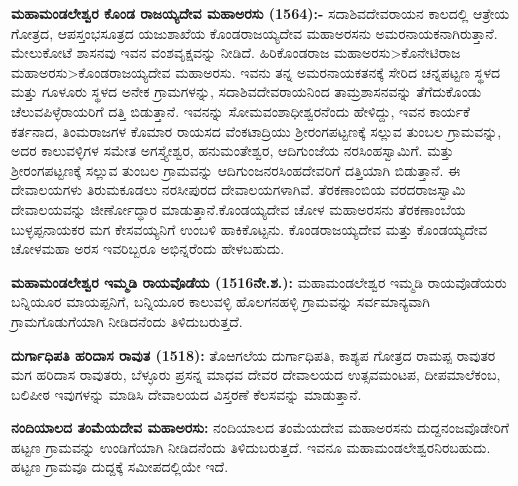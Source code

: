 \textbf{ಮಹಾಮಂಡಲೇಶ್ವರ ಕೊಂಡ ರಾಜಯ್ಯದೇವ ಮಹಾಅರಸು (1564):-} ಸದಾಶಿವದೇವರಾಯನ ಕಾಲದಲ್ಲಿ ಆತ್ರೇಯ ಗೋತ್ರದ, ಆಪಸ್ತಂಭಸೂತ್ರದ ಯಜುಶಾಖೆಯ ಕೊಂಡರಾಜಯ್ಯದೇವ ಮಹಾಅರಸನು ಅಮರನಾಯಕನಾಗಿರುತ್ತಾನೆ. ಮೇಲುಕೋಟೆ ಶಾಸನವು ಇವನ ವಂಶವೃಕ್ಷವನ್ನು ನೀಡಿದೆ. ಹಿರಿಕೊಂಡರಾಜ ಮಹಾಅರಸು\textgreater ಕೊನೇಟಿರಾಜ ಮಹಾಅರಸು\textgreater \break ಕೊಂಡರಾಜಯ್ಯದೇವ ಮಹಾಅರಸು. ಇವನು ತನ್ನ ಅಮರನಾಯಕತನಕ್ಕೆ ಸೇರಿದ ಚನ್ನಪಟ್ಟಣ ಸ್ಥಳದ ಮತ್ತು ಗೂಳೂರು ಸ್ಥಳದ ಅನೇಕ ಗ್ರಾಮಗಳನ್ನು, ಸದಾಶಿವದೇವರಾಯನಿಂದ ತಾಮ್ರಶಾಸನವನ್ನು ತೆಗೆದುಕೊಂಡು ಚೆಲುವಪಿಳ್ಳೆರಾಯರಿಗೆ ದತ್ತಿ ಬಿಡುತ್ತಾನೆ. ಇವನನ್ನು ಸೋಮವಂಶಾಧೀಶ್ವರನೆಂದು ಹೇಳಿದ್ದು, ಇವನ ಕಾರ್ಯಕೆ ಕರ್ತನಾದ, ತಿಂಮರಾಜಗಳ ಕೊಮಾರ ರಾಯಸದ ವೆಂಕಟಾದ್ರಿಯು ಶ‍್ರೀರಂಗಪಟ್ಟಣಕ್ಕೆ ಸಲ್ಲುವ ತುಂಬಲ ಗ್ರಾಮವನ್ನು, ಅದರ ಕಾಲುವಳ್ಳಿಗಳ ಸಮೇತ ಅಗಸ್ತ್ಯೇಶ್ವರ, ಹನುಮಂತೇಶ್ವರ, ಆದಿಗುಂಜೆಯ ನರಸಿಂಹಸ್ವಾಮಿಗೆ. ಮತ್ತು ಶ‍್ರೀರಂಗಪಟ್ಟಣಕ್ಕೆ ಸಲ್ಲುವ ತುಂಬಲ ಗ್ರಾಮವನ್ನು ಆದಿಗುಂಜನರಸಿಂಹದೇವರಿಗೆ ದತ್ತಿಯಾಗಿ ಬಿಡುತ್ತಾನೆ. ಈ ದೇವಾಲಯಗಳು ತಿರುಮಕೂಡಲು ನರಸೀಪುರದ ದೇವಾಲಯಗಳಾಗಿವೆ. ತೆರಕಣಾಂಬಿಯ ವರದರಾಜಸ್ವಾಮಿ ದೇವಾಲಯವನ್ನು ಜೀರ್ಣೋದ್ಧಾರ ಮಾಡುತ್ತಾನೆ.\break ಕೊಂಡಯ್ಯದೇವ ಚೋಳ ಮಹಾಅರಸನು ತೆರಕಣಾಂಬೆಯ ಬುಳ್ಳಪ್ಪನಾಯಕರ ಮಗ ಕೇಸವಯ್ಯನಿಗೆ ಉಂಬಳಿ ಹಾಕಿ\-ಕೊಟ್ಟನು. ಕೊಂಡರಾಜಯ್ಯದೇವ ಮತ್ತು ಕೊಂಡಯ್ಯದೇವ ಚೋಳಮಹಾ ಅರಸ ಇವರಿಬ್ಬರೂ ಅಭಿನ್ನರೆಂದು ಹೇಳಬಹುದು.

\textbf{ಮಹಾಮಂಡಲೇಶ್ವರ ಇಮ್ಮಡಿ ರಾಯವೊಡೆಯ (15\general{\enginline{-}}16ನೇ.ಶ.):} ಮಹಾಮಂಡಲೇಶ್ವರ ಇಮ್ಮಡಿ ರಾಯವೊಡೆಯರು ಬನ್ನಿಯೂರ ಮಾಯಪ್ಪನಿಗೆ, ಬನ್ನಿಯೂರ ಕಾಲುವಳ್ಳಿ ಹೊಲಗನಹಳ್ಳಿ ಗ್ರಾಮವನ್ನು ಸರ್ವಮಾನ್ಯವಾಗಿ ಗ್ರಾಮಗೊಡುಗೆಯಾಗಿ ನೀಡಿದನೆಂದು ತಿಳಿದುಬರುತ್ತದೆ.

\textbf{ದುರ್ಗಾಧಿಪತಿ ಹರಿದಾಸ ರಾವುತ (1518):} ತೊಱಗಲೆಯ ದುರ್ಗಾಧಿಪತಿ, ಕಾಶ್ಯಪ ಗೋತ್ರದ ರಾಮಪ್ಪ ರಾವುತರ ಮಗ ಹರಿದಾಸ ರಾವುತರು, ಬೆಳ್ಳೂರು ಪ್ರಸನ್ನ ಮಾಧವ ದೇವರ ದೇವಾಲಯದ ಉತ್ಸವಮಂಟಪ, ದೀಪಮಾಲೆಕಂಬ, ಬಲಿಪೀಠ ಇವುಗಳನ್ನು ಮಾಡಿಸಿ ದೇವಾಲಯದ ವಿಸ್ತರಣೆ ಕೆಲಸವನ್ನು ಮಾಡುತ್ತಾನೆ.

\textbf{ನಂದಿಯಾಲದ ತಂಮೆಯದೇವ ಮಹಾಅರಸು:} ನಂದಿಯಾಲದ ತಂಮೆಯದೇವ ಮಹಾಅರಸನು ದುದ್ದ\break ನಂಜವೊಡೇರಿಗೆ ಹಟ್ಟಣ ಗ್ರಾಮವನ್ನು ಉಂಡಿಗೆಯಾಗಿ ನೀಡಿದನೆಂದು ತಿಳಿದುಬರುತ್ತದೆ. ಇವನೂ ಮಹಾಮಂಡಲೇಶ್ವರನಿರ\-ಬಹುದು. ಹಟ್ಟಣ ಗ್ರಾಮವೂ ದುದ್ದಕ್ಕೆ ಸಮೀಪದಲ್ಲಿಯೇ ಇದೆ.

